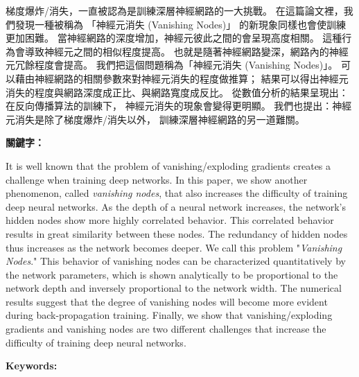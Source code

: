 \begin{abstractzh}
    梯度爆炸/消失，一直被認為是訓練深層神經網路的一大挑戰。
    在這篇論文裡，我們發現一種被稱為
    「神經元消失 (Vanishing Nodes)」
    的新現象同樣也會使訓練更加困難。
    當神經網路的深度增加，神經元彼此之間的會呈現高度相關。
    這種行為會導致神經元之間的相似程度提高。
    也就是隨著神經網路變深，網路內的神經元冗餘程度會提高。
    我們把這個問題稱為「神經元消失 (Vanishing Nodes)」。
    可以藉由神經網路的相關參數來對神經元消失的程度做推算；
    結果可以得出神經元消失的程度與網路深度成正比、與網路寬度成反比。
    從數值分析的結果呈現出：在反向傳播算法的訓練下，
    神經元消失的現象會變得更明顯。
    我們也提出：神經元消失是除了梯度爆炸/消失以外，
    訓練深層神經網路的另一道難關。

\bigbreak
\noindent \textbf{關鍵字：}{\, \makeatletter \@keywordszh \makeatother}
\end{abstractzh}

\begin{abstracten}
    It is well known that the problem of vanishing/exploding gradients creates a challenge when 
    training deep networks. In this paper, we show another phenomenon, called \textit{vanishing nodes},
    that also increases the difficulty of training deep neural networks.
    As the depth of a neural network increases, the network's hidden nodes show more highly
    correlated behavior. This correlated behavior results in great similarity between these nodes.
    The redundancy of hidden nodes thus increases as the network becomes deeper.
    We call this problem "\textit{Vanishing Nodes}."
    This behavior of vanishing nodes can be characterized quantitatively by the network parameters,
    which is shown analytically to be proportional to the network depth and inversely proportional
    to the network width. The numerical results suggest that the degree of vanishing nodes will become
    more evident during back-propagation training. Finally, we show that vanishing/exploding gradients
    and vanishing nodes are two different challenges that increase the difficulty of training deep
    neural networks.

\bigbreak
\noindent \textbf{Keywords:}{\, \makeatletter \@keywordsen \makeatother}
\end{abstracten}

\begin{comment}
\category{I2.10}{Computing Methodologies}{Artificial Intelligence --
Vision and Scene Understanding} \category{H5.3}{Information
Systems}{Information Interfaces and Presentation (HCI) -- Web-based
Interaction.}

\terms{Design, Human factors, Performance.}

\keywords{Deep learning}
\end{comment}
